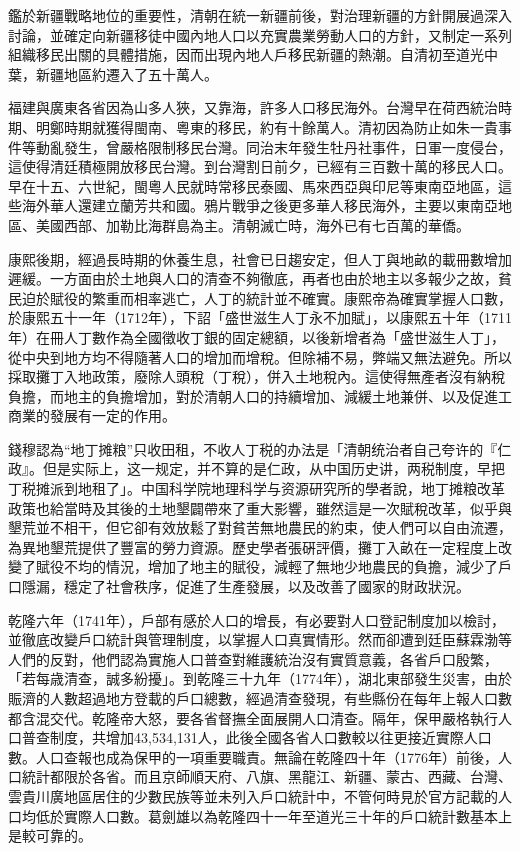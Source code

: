 鑑於新疆戰略地位的重要性，清朝在統一新疆前後，對治理新疆的方針開展過深入討論，並確定向新疆移徒中國內地人口以充實農業勞動人口的方針，又制定一系列組織移民出關的具體措施，因而出現內地人戶移民新疆的熱潮。自清初至道光中葉，新疆地區約遷入了五十萬人。

福建與廣東各省因為山多人狹，又靠海，許多人口移民海外。台灣早在荷西統治時期、明鄭時期就獲得閩南、粵東的移民，約有十餘萬人。清初因為防止如朱一貴事件等動亂發生，曾嚴格限制移民台灣。同治末年發生牡丹社事件，日軍一度侵台，這使得清廷積極開放移民台灣。到台灣割日前夕，已經有三百數十萬的移民人口。早在十五、六世紀，閩粵人民就時常移民泰國、馬來西亞與印尼等東南亞地區，這些海外華人還建立蘭芳共和國。鴉片戰爭之後更多華人移民海外，主要以東南亞地區、美國西部、加勒比海群島為主。清朝滅亡時，海外已有七百萬的華僑。

康熙後期，經過長時期的休養生息，社會已日趨安定，但人丁與地畝的載冊數增加遲緩。一方面由於土地與人口的清查不夠徹底，再者也由於地主以多報少之故，貧民迫於賦役的繁重而相率逃亡，人丁的統計並不確實。康熙帝為確實掌握人口數，於康熙五十一年（1712年），下詔「盛世滋生人丁永不加賦」，以康熙五十年（1711年）在冊人丁數作為全國徵收丁銀的固定總額，以後新增者為「盛世滋生人丁」，從中央到地方均不得隨著人口的增加而增稅。但除補不易，弊端又無法避免。所以採取攤丁入地政策，廢除人頭稅（丁稅），併入土地稅內。這使得無產者沒有納稅負擔，而地主的負擔增加，對於清朝人口的持續增加、減緩土地兼併、以及促進工商業的發展有一定的作用。

錢穆認為“地丁摊粮”只收田租，不收人丁税的办法是「清朝统治者自己夸许的『仁政』。但是实际上，这一规定，并不算的是仁政，从中国历史讲，两税制度，早把丁税摊派到地租了」。中国科学院地理科学与资源研究所的學者說，地丁摊粮改革政策也給當時及其後的土地墾闢帶來了重大影響，雖然這是一次賦稅改革，似乎與墾荒並不相干，但它卻有效放鬆了對貧苦無地農民的約束，使人們可以自由流遷，為異地墾荒提供了豐富的勞力資源。歷史學者張硏評價，攤丁入畝在一定程度上改變了賦役不均的情況，增加了地主的賦役，減輕了無地少地農民的負擔，減少了戶口隱漏，穩定了社會秩序，促進了生產發展，以及改善了國家的財政狀況。

乾隆六年（1741年），戶部有感於人口的增長，有必要對人口登記制度加以檢討，並徹底改變戶口統計與管理制度，以掌握人口真實情形。然而卻遭到廷臣蘇霖渤等人們的反對，他們認為實施人口普查對維護統治沒有實質意義，各省戶口殷繁，「若每歳清查，誠多紛擾」。到乾隆三十九年（1774年），湖北東部發生災害，由於賑濟的人數超過地方登載的戶口總數，經過清查發現，有些縣份在每年上報人口數都含混交代。乾隆帝大怒，要各省督撫全面展開人口清查。隔年，保甲嚴格執行人口普查制度，共增加43,534,131人，此後全國各省人口數較以往更接近實際人口數。人口查報也成為保甲的一項重要職責。無論在乾隆四十年（1776年）前後，人口統計都限於各省。而且京師順天府、八旗、黑龍江、新疆、蒙古、西藏、台灣、雲貴川廣地區居住的少數民族等並未列入戶口統計中，不管何時見於官方記載的人口均低於實際人口數。葛劍雄以為乾隆四十一年至道光三十年的戶口統計數基本上是較可靠的。

